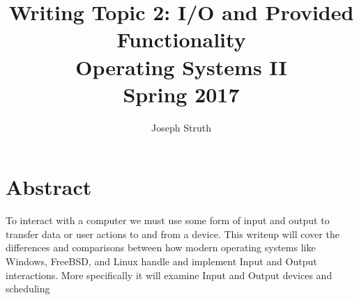 \documentclass[letterpaper,10pt,titlepage,draftclsnofoot,onecolumn]{IEEEtran}
\begin{document}
\title{Writing Topic 2: I/O and Provided Functionality\\
\large Operating Systems II \\ Spring 2017}
\author{Joseph Struth}
\begin{titlingpage}
    \maketitle
	\centering{}
\end{titlingpage}

\section{Abstract}
To interact with a computer we must use some form of input and output to transfer data or user actions to and from a device.
This writeup will cover the differences and comparisons between how modern operating systems like Windows, FreeBSD, and Linux handle and implement Input and Output interactions. More specifically it will examine Input and Output devices and scheduling
\end{document}

